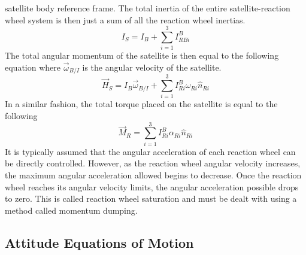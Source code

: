 \documentclass{article}
\begin{document}
satellite body reference frame. The total inertia of the entire
satellite-reaction wheel system is then just a sum of all the reaction wheel inertias.
\begin{equation}
   I_S = I_B + \sum\limits_{i=1}^3 I^{B}_{RBi}
\end{equation}
The total angular momentum of the satellite is then equal to the following
equation where $\vec{\omega}_{B/I}$ is the angular velocity of the
satellite. 
\begin{equation}
  \vec{H}_S = I_B\vec{\omega}_{B/I} + \sum\limits_{i=1}^3
  I^{B}_{Ri}\omega_{Ri}\hat{n}_{Ri}
\end{equation}
In a similar fashion, the total torque placed on the satellite is
equal to the following
\begin{equation}
  \vec{M}_{R} = \sum\limits_{i=1}^3 I^{B}_{Ri}\alpha_{Ri}\hat{n}_{Ri}
\end{equation}
It is typically assumed that the angular acceleration of each reaction
wheel can be directly controlled. However, as the reaction wheel
angular velocity increases, the maximum angular acceleration allowed
begins to decrease. Once the reaction wheel reaches its angular
velocity limits, the angular acceleration possible drops to zero. This
is called reaction wheel saturation and must be dealt with using a
method called momentum dumping.

\subsection{Attitude Equations of Motion}
\end{document}
